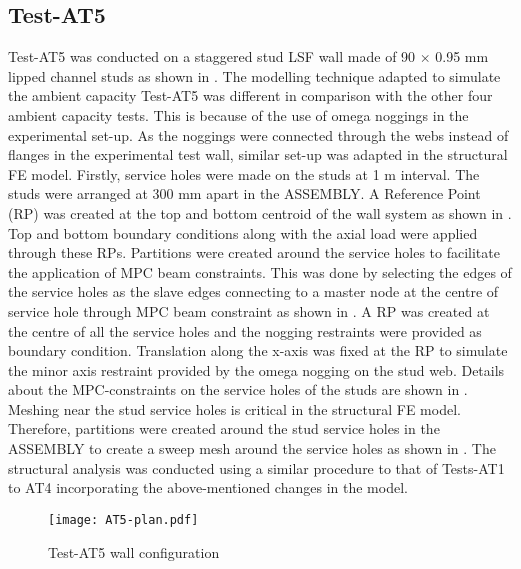 \subsection*{Test-AT5}

Test-AT5 was conducted on a staggered stud LSF wall made of 90 $\times$ 0.95 mm lipped channel studs as shown in . The modelling technique adapted to simulate the ambient capacity Test-AT5 was different in comparison with the other four ambient capacity tests. This is because of the use of omega noggings in the experimental set-up. As the noggings were connected through the webs instead of flanges in the experimental test wall, similar set-up was adapted in the structural FE model. Firstly, service holes were made on the studs at 1 m interval. The studs were arranged at 300 mm apart in the ASSEMBLY. A Reference Point (RP) was created at the top and bottom centroid of the wall system as shown in . Top and bottom boundary conditions along with the axial load were applied through these RPs. Partitions were created around the service holes to facilitate the application of MPC beam constraints. This was done by selecting the edges of the service holes as the slave edges connecting to a master node at the centre of service hole through MPC beam constraint as shown in . A RP was created at the centre of all the service holes and the nogging restraints were provided as boundary condition. Translation along the x-axis was fixed at the RP to simulate the minor axis restraint provided by the omega nogging on the stud web. Details about the MPC-constraints on the service holes of the studs are shown in . Meshing near the stud service holes is critical in the structural FE model. Therefore, partitions were created around the stud service holes in the ASSEMBLY to create a sweep mesh around the service holes as shown in . The structural analysis was conducted using a similar procedure to that of Tests-AT1 to AT4 incorporating the above-mentioned changes in the model.
\begin{figure}[!htbp]
	\centering
			\texttt{[image: AT5-plan.pdf]}\\
		\caption{Test-AT5 wall configuration}
		\label{fig:AT5-plan-fea}
\end{figure}    
